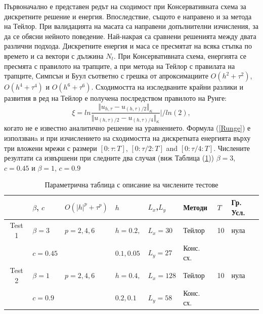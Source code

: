 \documentclass{article}
\newcommand{\rf}[1]{(\ref{#1})}
\begin{document}
Първоначално е представен редът на сходимост при Консервативната схема за дискретните решение и енергия. Впоследствие, същото е направено и за метода на Тейлор. При валидацията на масата са направени допълнителни изчисления, за да се обясни нейното поведение. Най-накрая са сравнени решенията между двата различни подхода. Дискретните енергия и маса се пресмятат на всяка стъпка по времето и са вектори с дължина $N_t$. При Консервативната схема, енергията се пресмята с правилото на трапците, а при метода на Тейлор с правилата на трапците, Симпсън и Буул съответно с грешка от апроксимациите $O(h^{2} + \tau^2 )$, $O(h^{4} + \tau^4 )$ и $O(h^{6} + \tau^6 )$. Сходимостта на изследваните крайни разлики и развития в ред на Тейлор е получена послредством правилото на Рунге:
\begin{equation}\label{Runge}
\xi = ln  \frac{\Vert u_{h,\tau} - u_{(h,\tau)/2} \Vert_\kappa } {\Vert  u_{(h,\tau)/2} - u_{(h,\tau)/4} \Vert_\kappa  } | / ln(2),
\end{equation}
когато не е известно аналитично решение на уравнението. Формула \rf{Runge} е използванa и при изчислението на сходимостта на дискретната енергията върху три вложени мрежи с размери $[0:\tau:T]$, $[0:\tau/2:T]$ and $[0:\tau/4:T]$. Числените резултати са извършени при следните два случая (виж Таблица \rf{tableP}) $\beta = 3$, $c=0.45$ и $\beta = 1$, $c=0.9$ \begin{table}
\centering
\small
		\begin{tabular}{||c|l|l|l|l|l|l|l||}
			\hline
			\hline
                                            &    $\beta$, $c$                              & $O(|h|^p+\tau^p)$   &      $h$                                & $L_x$,$L_y$                              &  Методи & $T$      & Гр. Усл.  \\
   			\hline 
					\hline
           Test 1                        &      $\beta = 3$     &      $p=2, 4, 6$    &    $h=0.2,$       & $L_x = 30$                & Тейлор &                10    &    нула  \\
                                             &      $c=0.45$         &                             &    $ 0.1, 0.05$   & $L_y=27$                  &  Конс. сх. &                &            \\
	   \hline
			\hline 
           Test 2                        &      $\beta = 1$     &      $p=2, 4, 6$    &     $h=0.4,$       & $L_x = 128$         & Тейлор  &               10    &   нула  \\
                                             &      $c=0.9$           &                             &      $0.2, 0.1$     & $L_y=58$              & Конс. сх.  &                   &     \\
	   \hline
			\hline 
		\end{tabular}
\caption{Параметрична таблица с описание на числените тестове}
\label{tableP}
\end{table}
\end{document}
